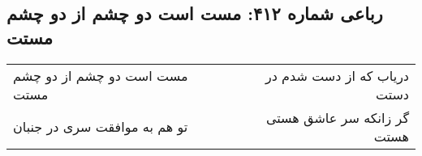 \begin{center}
\section*{رباعی شماره ۴۱۲: مست است دو چشم از دو چشم مستت}
\label{sec:0412}
\begin{longtable}{l p{0.5cm} r}
مست است دو چشم از دو چشم مستت
&&
دریاب که از دست شدم در دستت
\\
تو هم به موافقت سری در جنبان
&&
گر زانکه سر عاشق هستی هستت
\\
\end{longtable}
\end{center}
